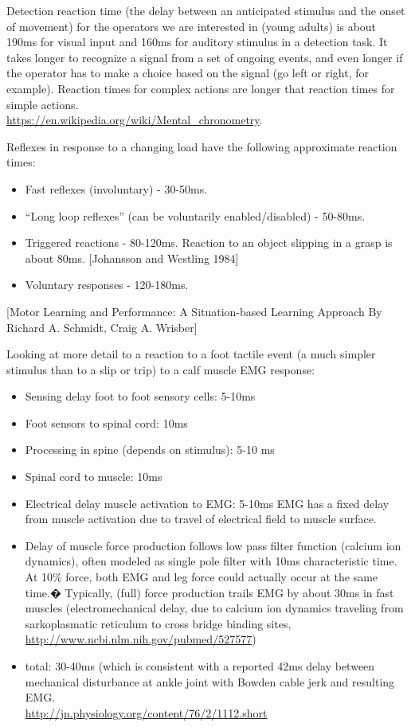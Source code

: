 \documentclass[letterpaper,12pt,fullpage]{article}
\begin{document}
Detection reaction time (the delay between an anticipated 
stimulus and the onset of movement) 
for the operators we are interested in (young adults)
is about
190ms for visual input and
160ms for auditory stimulus in a detection task.
It takes longer to recognize a signal from a set of ongoing events,
and even longer if the operator has to make a choice based on the signal
(go left or right, for example).
Reaction times for complex actions are longer that reaction times
for simple actions.\\
\url{https://en.wikipedia.org/wiki/Mental_chronometry}.

Reflexes in response to a changing load have the following approximate reaction times:
\begin{itemize}
\item
Fast reflexes (involuntary) - 30-50ms.
\item
``Long loop reflexes'' (can be voluntarily enabled/disabled) - 50-80ms.
\item
Triggered reactions - 80-120ms.
Reaction to an object slipping in a grasp is about 80ms.
[Johansson and Westling 1984]
\item
Voluntary responses - 120-180ms.
\end{itemize}
[Motor Learning and Performance: A Situation-based Learning Approach
 By Richard A. Schmidt, Craig A. Wrisber]

Looking at more detail to a reaction to a foot tactile event (a much
simpler stimulus than to a slip or trip)
to a calf muscle EMG response:
\begin{itemize}
\item
Sensing delay foot to foot sensory cells: 5-10ms
\item
Foot sensors to spinal cord: 10ms 
\item
Processing in spine (depends on stimulus): 5-10 ms
\item
Spinal cord to muscle: 10ms 
\item
Electrical delay muscle activation to EMG: 5-10ms
EMG has a fixed delay from muscle activation due to
travel of electrical field to muscle surface.
\item
Delay
of muscle force production follows low pass filter function (calcium
ion dynamics), often modeled as single pole filter with 10ms
characteristic time. At 10\% force, both EMG and leg force could
actually occur at the same time.�
Typically, (full) force production trails EMG by about 30ms in fast
muscles (electromechanical delay, due to calcium ion dynamics
traveling from sarkoplasmatic reticulum to cross bridge binding
sites,\\
\url{http://www.ncbi.nlm.nih.gov/pubmed/527577})
\item
total: 30-40ms (which is consistent with a reported 42ms delay
between mechanical disturbance at ankle joint with Bowden cable jerk
and resulting EMG.\\
\url{http://jn.physiology.org/content/76/2/1112.short}
\end{itemize}
\end{document}
